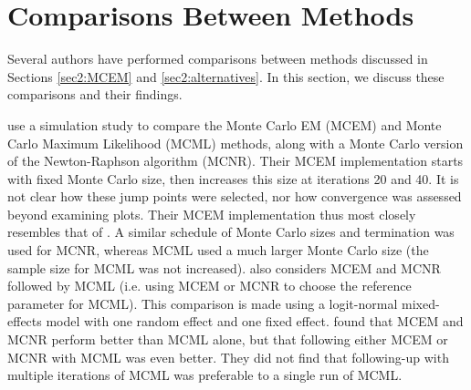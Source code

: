 \documentclass[11pt, oneside]{article}   	%
\newcommand{\bQ}{\mathbb{Q}}
\begin{document}
\begin{comment}
A major advantage of the mean-field approximation is that an iterative algorithm exists for finding the density, $q$, which maximizes the ELBO. This algorithm performs coordinate ascent, and the coordinate updates are closely related to computation of the full conditional distributions in Gibbs sampling \citep{need}. Write $q^{(k)} = \prod q_j^{(k)}$ for the current value of $q$, and $\bQ^{(k)}_{-j}$ for expectation with respect to all the missing variables except $j$, under $q^{(k)}$. The update formula is
%
\begin{align}
    q_j^{(k+1)} &\propto \exp \left[ \bQ^{(k)}_{-j} \ell_c(y, x_j, X_{-j}) \right] \label{eq:var_inf_update}
\end{align}
%
where $X_{-j}$ is all the missing variables other than $X_j$. See Section 2.4 of \citet{Ble17} for a derivation of (\ref{eq:var_inf_update}). The overall algorithm consists of repeatedly cycling through updating each coordinate's distribution until some convergence criterion is met.

Note that, so far, our discussion of how to compute the mean-field approximate density for $X$ has not addressed $\theta$. To apply mean-field variational inference to EM-type problems, we substitute the mean-field density into the ELBO and maximize over $\theta$. This new value of $\theta$ is fed back into ($\ref{eq:var_inf_update}$), giving us a different complete data likelihood function and, hence, a new optimal density.
\end{comment}

\section{Comparisons Between Methods}
\label{sec2:comparison}

Several authors have performed comparisons between methods discussed in Sections \ref{sec2:MCEM} and \ref{sec2:alternatives}. In this section, we discuss these comparisons and their findings.

\citet{McC97} use a simulation study to compare the Monte Carlo EM (MCEM) and Monte Carlo Maximum Likelihood (MCML) methods, along with a Monte Carlo version of the Newton-Raphson algorithm (MCNR). Their MCEM implementation starts with fixed Monte Carlo size, then increases this size at iterations 20 and 40. It is not clear how these jump points were selected, nor how convergence was assessed beyond examining plots. Their MCEM implementation thus most closely resembles that of \citet{Wei90}. A similar schedule of Monte Carlo sizes and termination was used for MCNR, whereas MCML used a much larger Monte Carlo size (the sample size for MCML was not increased). \citeauthor{McC97} also considers MCEM and MCNR followed by MCML (i.e. using MCEM or MCNR to choose the reference parameter for MCML). This comparison is made using a logit-normal mixed-effects model with one random effect and one fixed effect. \citeauthor{McC97} found that MCEM and MCNR perform better than MCML alone, but that following either MCEM or MCNR with MCML was even better. They did not find that following-up with multiple iterations of MCML was preferable to a single run of MCML.
\end{document}
